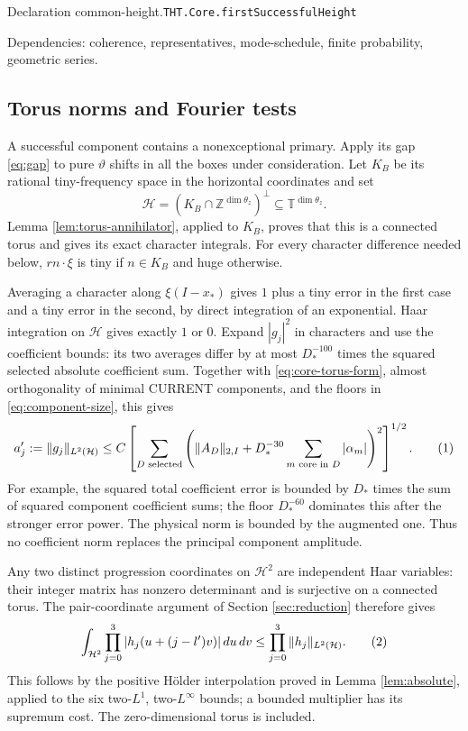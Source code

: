 \documentclass[11pt]{article}
\theoremstyle{definition}
\newcommand{\Z}{\mathbb Z}
\newcommand{\T}{\mathbb T}
\newcommand{\eqtag}[1]{\refstepcounter{equation}\tag{\theequation}\label{#1}}
\numberwithin{equation}{section}
\newcommand{\bp}[3]{\par\smallskip\begingroup\footnotesize
\noindent\hypertarget{bp:#1}{\textsf{Declaration #1.}}\quad\nolinkurl{#2}\par
\noindent\textsf{Dependencies:} #3.\par\endgroup\smallskip}
\begin{document}
\bp{common-height}{THT.Core.firstSuccessfulHeight}{coherence, representatives, mode-schedule, finite probability, geometric series}

\subsection*{Torus norms and Fourier tests}
A successful component contains a nonexceptional primary. Apply its gap \eqref{eq:gap} to pure $\vartheta$ shifts in all the boxes under consideration. Let $K_B$ be its rational tiny-frequency space in the horizontal coordinates and set
\[
 \mathcal H=(K_B\cap\Z^{\dim\theta_z})^\perp\subseteq\T^{\dim\theta_z}.
\]
Lemma \ref{lem:torus-annihilator}, applied to $K_B$, proves that this is a connected torus and gives its exact character integrals. For every character difference needed below, $r n\cdot\xi$ is tiny if $n\in K_B$ and huge otherwise.

Averaging a character along $\xi(I-x_*)$ gives $1$ plus a tiny error in the first case and a tiny error in the second, by direct integration of an exponential. Haar integration on $\mathcal H$ gives exactly $1$ or $0$. Expand $|g_j|^2$ in characters and use the coefficient bounds: its two averages differ by at most $D_*^{-100}$ times the squared selected absolute coefficient sum. Together with \eqref{eq:core-torus-form}, almost orthogonality of minimal CURRENT components, and the floors in \eqref{eq:component-size}, this gives
\[
 a'_j:=\|g_j\|_{L^2(\mathcal H)}
 \le C\left[\sum_{D\text{ selected}}
 \left(\|A_D\|_{2,I}+D_*^{-30}\sum_{m\text{ core in }D}|\alpha_m|\right)^2\right]^{1/2}.
 \eqtag{eq:torus-size}
\]
For example, the squared total coefficient error is bounded by $D_*$ times the sum of squared component coefficient sums; the floor $D_*^{-60}$ dominates this after the stronger error power. The physical norm is bounded by the augmented one. Thus no coefficient norm replaces the principal component amplitude.

Any two distinct progression coordinates on $\mathcal H^2$ are independent Haar variables: their integer matrix has nonzero determinant and is surjective on a connected torus. The pair-coordinate argument of Section \ref{sec:reduction} therefore gives
\[
 \int_{\mathcal H^2}\prod_{j=0}^3|h_j(u+(j-l')v)|\,du\,dv
 \le\prod_{j=0}^3\|h_j\|_{L^2(\mathcal H)}.
 \eqtag{eq:Haar-four}
\]
This follows by the positive H\"older interpolation proved in Lemma \ref{lem:absolute}, applied to the six two-$L^1$, two-$L^\infty$ bounds; a bounded multiplier has its supremum cost. The zero-dimensional torus is included.
\end{document}

